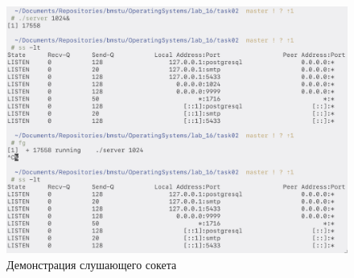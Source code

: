 \begin{figure}[H]
    \centering
    \includegraphics[scale=0.35]{images/check02.png}
    \caption{Демонстрация слушающего сокета}\label{img:check02}
\end{figure}

